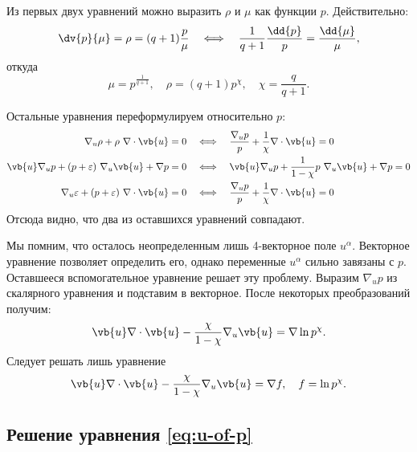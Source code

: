 \documentclass[\docroot/reports/draft/report.tex]{subfiles}
\begin{document}
    Из первых двух уравнений можно выразить $\rho$ и $\mu$ как функции $p$. Действительно:
    \begin{equation*}
        \dv{p}{\mu} = \rho = (q + 1) \frac{p}{\mu} \quad\Longleftrightarrow\quad
        \frac{1}{q + 1} \frac{\dd{p}}{p} = \frac{\dd{\mu}}{\mu} ,
    \end{equation*}
    откуда
    \begin{equation*}
        \mu = p^{\frac{1}{q + 1}} , \quad \rho = (q + 1) p^{\chi} , \quad \chi = \frac{q}{q + 1} .
    \end{equation*}

    Остальные уравнения переформулируем относительно $p$:
    \begin{align*}
        \nabla_u \rho + \rho\ \nabla \cdot \vb{u} = 0 \quad&\Longleftrightarrow\quad
        \frac{\nabla_u p}{p} + \frac{1}{\chi} \nabla \cdot \vb{u} = 0 \\
        \vb{u} \nabla_u p + (p + \varepsilon)\ \nabla_u \vb{u} + \nabla p = 0 \quad&\Longleftrightarrow\quad
        \vb{u} \nabla_u p + \frac{1}{1-\chi} p\ \nabla_u \vb{u} + \nabla p = 0 \\
        \nabla_u \varepsilon + (p + \varepsilon)\ \nabla \cdot \vb{u} = 0 \quad&\Longleftrightarrow\quad
        \frac{\nabla_u p}{p} + \frac{1}{\chi} \nabla \cdot \vb{u} = 0
    \end{align*}
    Отсюда видно, что два из оставшихся уравнений совпадают.

    Мы помним, что осталось неопределенным лишь 4-векторное поле $u^\alpha$. Векторное уравнение позволяет определить его, однако переменные $u^\alpha$ сильно завязаны с $p$. Оставшееся вспомогательное уравнение решает эту проблему. Выразим $\nabla_u p$ из скалярного уравнения и подставим в векторное. После некоторых преобразований получим:
    \begin{equation}
        \vb{u} \nabla \cdot \vb{u} - \frac{\chi}{1 - \chi} \nabla_u \vb{u} = \nabla \ln p^{\chi} .
    \end{equation}
    Следует решать лишь уравнение
    \begin{equation}\label{eq:u-of-p}
        \vb{u} \nabla \cdot \vb{u} - \frac{\chi}{1 - \chi} \nabla_u \vb{u} = \nabla f , \quad f = \ln p^{\chi} .
    \end{equation}

\subsection{Решение уравнения \autoref{eq:u-of-p}}
\end{document}
